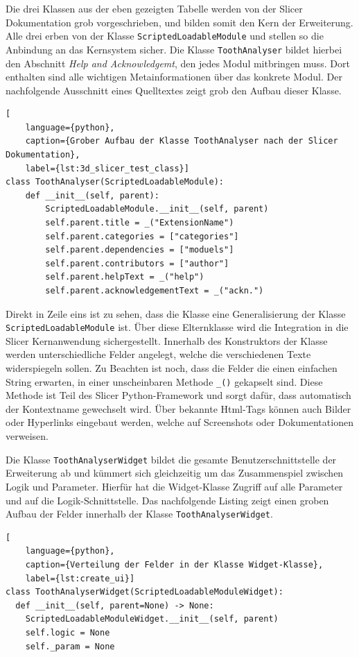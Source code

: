 Die drei Klassen aus der eben gezeigten Tabelle werden von der Slicer
Dokumentation grob vorgeschrieben, und bilden somit den Kern der Erweiterung.
Alle drei erben von der Klasse \texttt{ScriptedLoadableModule} und stellen so die
Anbindung an das Kernsystem sicher. Die Klasse \texttt{ToothAnalyser} bildet hierbei
den Abschnitt \textit{Help and Acknowledgemt}, den jedes Modul mitbringen muss.
Dort enthalten sind alle wichtigen Metainformationen über das konkrete Modul. Der
nachfolgende Ausschnitt eines Quelltextes zeigt grob den Aufbau dieser Klasse.

\begin{lstlisting}[
    language={python},
    caption={Grober Aufbau der Klasse ToothAnalyser nach der Slicer Dokumentation},
    label={lst:3d_slicer_test_class}]
class ToothAnalyser(ScriptedLoadableModule):
    def __init__(self, parent):
	    ScriptedLoadableModule.__init__(self, parent)
	    self.parent.title = _("ExtensionName")
	    self.parent.categories = ["categories"]
	    self.parent.dependencies = ["moduels"]
	    self.parent.contributors = ["author"]
	    self.parent.helpText = _("help")
	    self.parent.acknowledgementText = _("ackn.")
\end{lstlisting}

Direkt in Zeile eins ist zu sehen, dass die Klasse eine Generalisierung der Klasse
\texttt{ScriptedLoadableModule} ist. Über diese Elternklasse wird die Integration
in die Slicer Kernanwendung sichergestellt. Innerhalb des Konstruktors der
Klasse werden unterschiedliche Felder angelegt, welche die verschiedenen Texte widerspiegeln
sollen. Zu Beachten ist noch, dass die Felder die einen einfachen String erwarten,
in einer unscheinbaren Methode \texttt{\_()} gekapselt sind. Diese Methode ist
Teil des Slicer Python-Framework und sorgt dafür, dass automatisch der Kontextname
gewechselt wird. Über bekannte Html-Tags können auch Bilder oder Hyperlinks
eingebaut werden, welche auf Screenshots oder Dokumentationen verweisen.

Die Klasse \texttt{ToothAnalyserWidget} bildet die gesamte Benutzerschnittstelle
der Erweiterung ab und kümmert sich gleichzeitig um das Zusammenspiel zwischen
Logik und Parameter. Hierfür hat die Widget-Klasse Zugriff auf alle Parameter und
auf die Logik-Schnittstelle. Das nachfolgende Listing zeigt einen groben Aufbau
der Felder innerhalb der Klasse \texttt{ToothAnalyserWidget}.

\begin{lstlisting}[
    language={python},
    caption={Verteilung der Felder in der Klasse Widget-Klasse},
    label={lst:create_ui}]
class ToothAnalyserWidget(ScriptedLoadableModuleWidget):
  def __init__(self, parent=None) -> None:
    ScriptedLoadableModuleWidget.__init__(self, parent)
    self.logic = None
    self._param = None
\end{lstlisting}

